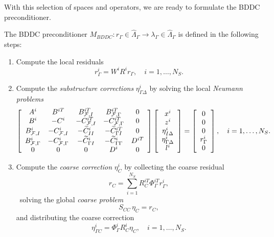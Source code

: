 With this selection of spaces and operators, we are ready to formulate the BDDC preconditioner.
\begin{algorithm}
\label{alg:bddc}The BDDC preconditioner $M_{BDDC}:r_{\Gamma}\in
\widehat{\Lambda}_{\Gamma}\rightarrow\lambda_{\Gamma}\in\widehat{\Lambda
}_{\Gamma}$ is defined in the following steps:

\begin{enumerate}
\item Compute the local residuals
\begin{equation}
r_{\Gamma}^{i}=W^{i}R^{i}r_{\Gamma},\quad i=1,\dots,N_{S}.
\end{equation}

\item Compute the \emph{substructure corrections} $\eta_{\Gamma \Delta}^{i}$ by
solving the local\emph{ Neumann problems}
\begin{equation}
\left[
\begin{array}
[c]{ccccc}%
A^{i} & B^{iT} & B_{\mathcal{F},I}^{iT} & B_{\mathcal{F},\Gamma}^{iT} & 0\\
B^{i} & -C^{i} & -C_{\mathcal{F},I}^{iT} & -C_{\mathcal{F},\Gamma
}^{iT} & 0\\
B_{\mathcal{F},I}^{i} & -C_{\mathcal{F},I}^{i} & -\widetilde{C}_{II}^{i} &
-\widetilde{C}_{{\Gamma}I}^{iT} & 0\\
B_{\mathcal{F},\Gamma}^{i} & -C_{\mathcal{F},\Gamma}^{i} & -\widetilde{C}%
_{{\Gamma}I}^{i} & -\widetilde{C}_{{\Gamma}{\Gamma}}^{i} & D^{iT}\\
0 & 0 & 0 & D^{i} & 0
\end{array}
\right]  \left[
\begin{array}
[c]{c}%
x^{i}\\
z^{i}\\
\eta_{I \Delta }^{i}\\
\eta_{\Gamma \Delta}^{i}\\
l^{i}%
\end{array}
\right]  =\left[
\begin{array}
[c]{c}%
0\\
0\\
0\\
r_{\Gamma}^{i}\\
0
\end{array}
\right]  ,\quad i=1,\dots,N_{S}.\label{eq:BDDC-substructure-problem}%
\end{equation}


\item Compute the \emph{coarse correction} $\eta_{C}^{i}$ by collecting the
coarse residual
\begin{equation}
r_{C}=\sum_{i=1}^{N_{S}}R_{C}^{iT}\Phi_{\Gamma}^{iT}r_{\Gamma}^{i},
\end{equation}
\ solving the global \emph{coarse problem}
\begin{equation}
S_{CC}\,\eta_{C}=r_{C},\label{eq:BDDC-coarse-problem}%
\end{equation}
and distributing the coarse correction%
\begin{equation}
\eta_{\Gamma C}^{i}=\Phi_{\Gamma}^{i}R_{C}^{i}\eta_{C},\quad i=1,\dots,N_{S}.
\end{equation}


\end{enumerate}
\end{algorithm}

